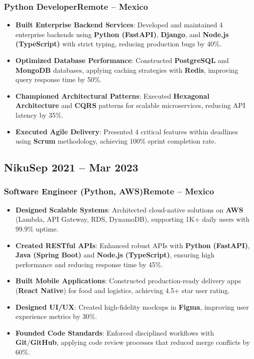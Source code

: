 \documentclass[a4paper,10pt]{article}
\newcommand{\kw}[1]{\textbf{\textcolor{keyword}{#1}}}
\newcommand{\tech}[1]{\textbf{\textcolor{tech}{#1}}}
\begin{document}
\subsubsection*{\small Python Developer\hfill Remote -- Mexico}
\begin{itemize}[noitemsep, leftmargin=*]
    \item \textbf{Built Enterprise Backend Services}: Developed and maintained 4 enterprise backends using \tech{Python (FastAPI)}, \tech{Django}, and \tech{Node.js (TypeScript)} with strict typing, reducing production bugs by 40\%.
    \item \textbf{Optimized Database Performance}: Constructed \kw{PostgreSQL} and \kw{MongoDB} databases, applying caching strategies with \tech{Redis}, improving query response time by 50\%.
    \item \textbf{Championed Architectural Patterns}: Executed \kw{Hexagonal Architecture} and \kw{CQRS} patterns for scalable microservices, reducing API latency by 35\%.
    \item \textbf{Executed Agile Delivery}: Presented 4 critical features within deadlines using \kw{Scrum} methodology, achieving 100\% sprint completion rate.
\end{itemize}

\subsection*{\small Niku\hfill\textbf{Sep 2021 -- Mar 2023}}
\subsubsection*{\small Software Engineer (Python, AWS)\hfill Remote -- Mexico}
\begin{itemize}[noitemsep, leftmargin=*]
    \item \textbf{Designed Scalable Systems}: Architected cloud-native solutions on \tech{AWS} (Lambda, API Gateway, RDS, DynamoDB), supporting 1K+ daily users with 99.9\% uptime.
    \item \textbf{Created RESTful APIs}: Enhanced robust APIs with \tech{Python (FastAPI)}, \tech{Java (Spring Boot)} and \tech{Node.js (TypeScript)}, ensuring high performance and reducing response time by 45\%.
    \item \textbf{Built Mobile Applications}: Constructed production-ready delivery apps (\tech{React Native}) for food and logistics, achieving 4.5+ star user rating.
    \item \textbf{Designed UI/UX}: Created high-fidelity mockups in \tech{Figma}, improving user experience metrics by 30\%.
    \item \textbf{Founded Code Standards}: Enforced disciplined workflows with \tech{Git}/\tech{GitHub}, applying code review processes that reduced merge conflicts by 60\%.
\end{itemize}
\end{document}
